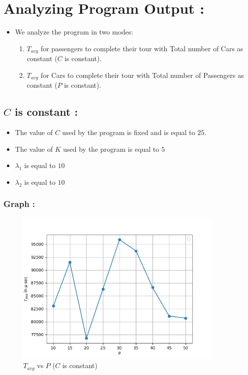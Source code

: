 \documentclass[12pt,a4paper]{article}
\begin{document}
	\section{ Analyzing Program Output :} 
	
	\begin{itemize}
		\item We analyze the program in two modes:
		\begin{enumerate}
			\item $T_{avg}$ for passengers to complete their tour with Total number of Cars as constant ($C$ is constant).
			\item $T_{avg}$ for Cars to complete their tour with Total number of Passengers as constant ($P$ is constant).
		\end{enumerate}
	\end{itemize}
	
	\subsection{$C$ is constant :}
	\begin{itemize}
		\item The value of $C$ used by the program is fixed and is equal to $25$.
		\item The value of $K$ used by the program is equal to $5$
		\item $\lambda _1$ is equal to $10$
		\item $\lambda _2$ is equal to $10$
	\end{itemize}
	
	\subsubsection{Graph :}
	\begin{figure}[H]
		\centering
		\includegraphics[width=0.9\textwidth]{C_const}
		\caption{$T_{avg}$ vs $P$ ($C$ is constant)}
	\end{figure}
\end{document}
